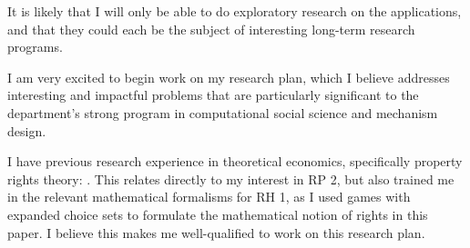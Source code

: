 \documentclass{article}
\begin{document}
It is likely that I will only be able to do exploratory research on the applications, and that they could each be the subject of interesting long-term research programs.

\par\medskip

I am very excited to begin work on my research plan, which I believe addresses interesting and impactful problems that are particularly significant to the department's strong program in computational social science and mechanism design. 

I have previous research experience in theoretical economics, specifically property rights theory: \cite{pasu}. This relates directly to my interest in RP 2, but also trained me in the relevant mathematical formalisms for RH 1, as I used games with expanded choice sets to formulate the mathematical notion of rights in this paper. I believe this makes me well-qualified to work on this research plan.

%
%
\printbibliography
\end{document}
